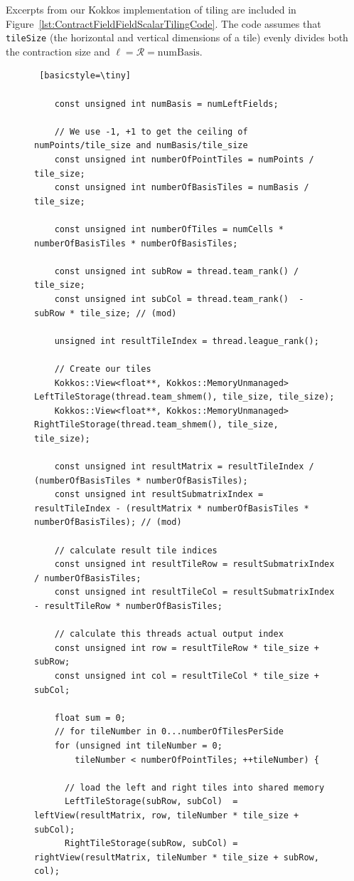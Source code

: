     Excerpts from our Kokkos implementation of tiling are included in Figure~\ref{lst:ContractFieldFieldScalarTilingCode}. The
code assumes that \texttt{tileSize} (the horizontal and vertical dimensions of a tile)
evenly divides both the contraction size and $\ell = \mathcal{R} =
\text{numBasis}$.
	
\begin{figure}[H]
    \begin{lstlisting} [basicstyle=\tiny]
    
    const unsigned int numBasis = numLeftFields;

    // We use -1, +1 to get the ceiling of numPoints/tile_size and numBasis/tile_size
    const unsigned int numberOfPointTiles = numPoints / tile_size;
    const unsigned int numberOfBasisTiles = numBasis / tile_size;

    const unsigned int numberOfTiles = numCells * numberOfBasisTiles * numberOfBasisTiles;

    const unsigned int subRow = thread.team_rank() / tile_size;
    const unsigned int subCol = thread.team_rank()  - subRow * tile_size; // (mod)

    unsigned int resultTileIndex = thread.league_rank();

    // Create our tiles
    Kokkos::View<float**, Kokkos::MemoryUnmanaged> LeftTileStorage(thread.team_shmem(), tile_size, tile_size);
    Kokkos::View<float**, Kokkos::MemoryUnmanaged> RightTileStorage(thread.team_shmem(), tile_size, tile_size);

    const unsigned int resultMatrix = resultTileIndex / (numberOfBasisTiles * numberOfBasisTiles);
    const unsigned int resultSubmatrixIndex = resultTileIndex - (resultMatrix * numberOfBasisTiles * numberOfBasisTiles); // (mod)

    // calculate result tile indices
    const unsigned int resultTileRow = resultSubmatrixIndex / numberOfBasisTiles;
    const unsigned int resultTileCol = resultSubmatrixIndex  - resultTileRow * numberOfBasisTiles;

    // calculate this threads actual output index
    const unsigned int row = resultTileRow * tile_size + subRow;
    const unsigned int col = resultTileCol * tile_size + subCol;

    float sum = 0;
    // for tileNumber in 0...numberOfTilesPerSide
    for (unsigned int tileNumber = 0;
        tileNumber < numberOfPointTiles; ++tileNumber) {

      // load the left and right tiles into shared memory
      LeftTileStorage(subRow, subCol)  = leftView(resultMatrix, row, tileNumber * tile_size + subCol);
      RightTileStorage(subRow, subCol) = rightView(resultMatrix, tileNumber * tile_size + subRow, col);
      

\end{lstlisting}
\end{figure}
